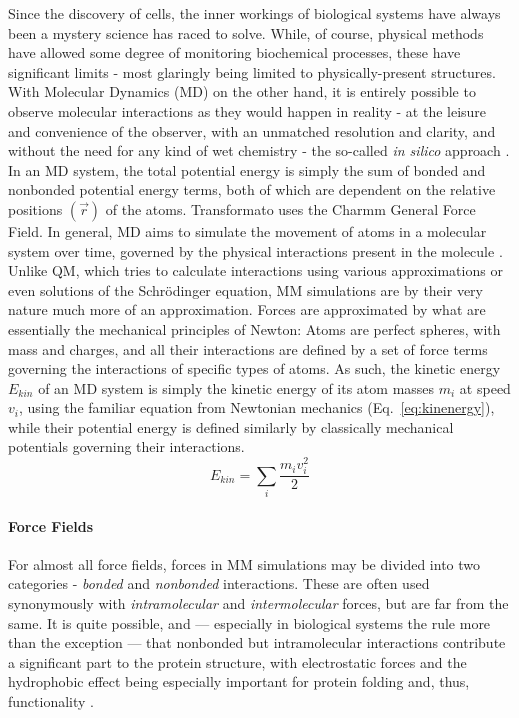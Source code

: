 \documentclass[oneside]{scrreprt}
\begin{document}
Since the discovery of cells, the inner workings of biological systems have always been a mystery science has raced to solve. While, of course, physical methods have allowed some degree of monitoring biochemical processes, these have significant limits - most glaringly being limited to physically-present structures. With Molecular Dynamics (MD) on the other hand, it is entirely possible to observe molecular interactions as they would happen in reality - at the leisure and convenience of the observer, with an unmatched resolution and clarity, and without the need for any kind of wet chemistry - the so-called \emph{in silico}  approach \cite{dror_biomolecular_2012}.
In an MD system, the total potential energy is simply the sum of bonded and nonbonded potential energy terms, both of which are dependent on the relative positions $(\Vec{r})$ of the atoms. Transformato uses the Charmm General Force Field\cite{vanommeslaeghe_charmm_2010}.
In general, MD aims to simulate the movement of atoms in a molecular system over time, governed by the physical interactions present in the molecule \cite{Hollingsworth2018Sep}. Unlike QM, which tries to calculate interactions using various approximations or even solutions of the Schrödinger equation, MM simulations are by their very nature much more of an approximation. Forces are approximated by what are essentially the mechanical principles of Newton: Atoms are perfect spheres, with mass and charges, and all their interactions are defined by a set of force terms governing the interactions of specific types of atoms. As such, the kinetic energy $E_{kin}$ of an MD system is simply the kinetic energy of its atom masses $m_i$  at speed $v_i$, using the familiar equation from Newtonian mechanics (Eq.~\ref{eq:kinenergy}), while their potential energy is defined  similarly by classically mechanical potentials governing their interactions.
\begin{equation}\label{eq:kinenergy}
    E_{kin}=\sum_i\frac{m_i v_i^2}{2}
\end{equation}

\paragraph{Force Fields}
For almost all force fields, forces in MM simulations may be divided into two categories - \emph{bonded} and \emph{nonbonded} interactions. These are often used synonymously with \emph{intramolecular} and \emph{intermolecular} forces, but are far from the same. It is quite possible, and --- especially in biological systems the rule more than the exception --- that nonbonded but intramolecular interactions contribute a significant part to the protein structure, with electrostatic forces and the hydrophobic effect being especially important for protein folding and, thus, functionality \cite{kumar_close-range_2002}.
\end{document}
